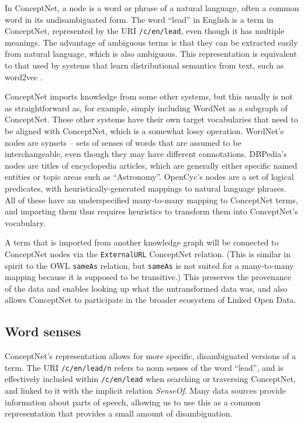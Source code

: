 \documentclass[letterpaper]{article}
\begin{document}
In ConceptNet, a node is a word or phrase of a natural language, often a
common word in its undisambiguated form. The word ``lead'' in English is
a term in ConceptNet, represented by the URI \texttt{/c/en/lead}, even
though it has multiple meanings. The advantage of ambiguous terms is
that they can be extracted easily from natural language, which is also
ambiguous. This representation is equivalent to that used by systems
that learn distributional semantics from text, such as word2vec
\cite{mikolov2013word2vec}.

ConceptNet imports knowledge from some other systems, but this usually
is not as straightforward as, for example, simply including WordNet as a
subgraph of ConceptNet. These other systems have their own target
vocabularies that need to be aligned with ConceptNet, which is a
somewhat lossy operation. WordNet's nodes are synsets -- sets of senses
of words that are assumed to be interchangeable, even though they may
have different connotations. DBPedia's nodes are titles of encyclopedia
articles, which are generally either specific named entities or topic
areas such as ``Astronomy''. OpenCyc's nodes are a set of logical
predicates, with heuristically-generated mappings to natural language
phrases. All of these have an underspecified many-to-many mapping to
ConceptNet terms, and importing them thus requires heuristics to
transform them into ConceptNet's vocabulary.

A term that is imported from another knowledge graph will be connected
to ConceptNet nodes via the \texttt{ExternalURL} ConceptNet relation.
(This is similar in spirit to the OWL \texttt{sameAs} relation, but
\texttt{sameAs} is not suited for a many-to-many mapping because it is
supposed to be transitive.) This preserves the provenance of the data
and enables looking up what the untransformed data was, and also allows
ConceptNet to participate in the broader ecosystem of Linked Open Data.

\subsection{Word senses}\label{word-senses}

ConceptNet's representation allows for more specific, disambiguated
versions of a term. The URI \texttt{/c/en/lead/n} refers to noun senses
of the word ``lead'', and is effectively included within
\texttt{/c/en/lead} when searching or traversing ConceptNet, and
linked to it with the implicit relation \emph{SenseOf}. Many data
sources provide information about parts of speech, allowing us to use
this as a common representation that provides a small amount of
disambiguation.
\end{document}

